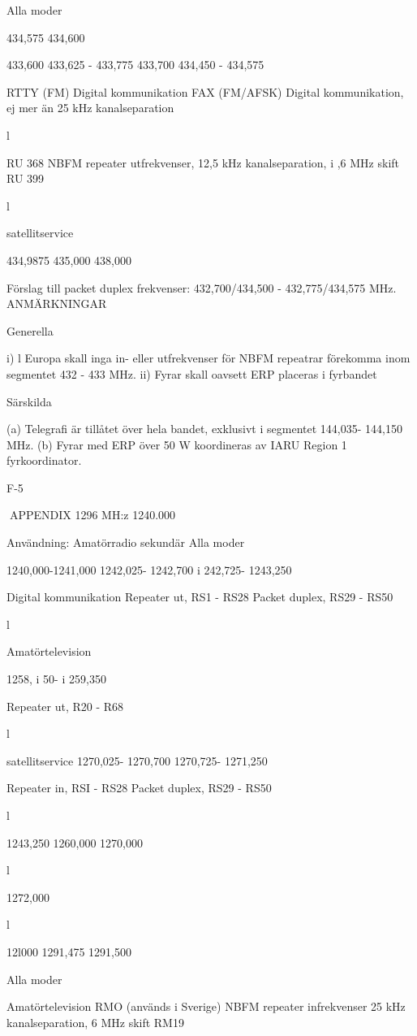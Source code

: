 \documentclass[a4paper,twoside,twocolumn,openright]{book}
\begin{document}
{{{{{{{{{{{Alla moder

434,575
434,600

433,600
433,625 - 433,775
433,700
434,450 - 434,575

RTTY (FM)
Digital kommunikation
FAX (FM/AFSK)
Digital kommunikation, ej mer än
25 kHz kanalseparation

l

RU 368
NBFM repeater utfrekvenser, 12,5 kHz kanalseparation, i ,6 MHz skift
RU 399

l

satellitservice

434,9875
435,000
438,000

Förslag till packet duplex frekvenser: 432,700/434,500 - 432,775/434,575 MHz.
ANMÄRKNINGAR

Generella

i) l Europa skall inga in- eller utfrekvenser för NBFM repeatrar förekomma inom segmentet 432 - 433 MHz.
ii) Fyrar skall oavsett ERP placeras i fyrbandet

Särskilda

(a) Telegrafi är tillåtet över hela bandet, exklusivt i segmentet 144,035- 144,150 MHz.
(b) Fyrar med ERP över 50 W koordineras av IARU Region 1 fyrkoordinator.

F-5

APPENDIX
1296 MH:z
1240.000

Användning: Amatörradio sekundär
Alla moder

1240,000-1241,000
1242,025- 1242,700
i 242,725- 1243,250

Digital kommunikation
Repeater ut, RS1 - RS28
Packet duplex, RS29 - RS50

l

Amatörtelevision

1258, i 50- i 259,350

Repeater ut, R20 - R68

l

satellitservice
1270,025- 1270,700
1270,725- 1271,250

Repeater in, RSI - RS28
Packet duplex, RS29 - RS50

l

1243,250
1260,000
1270,000

l

1272,000

l

12l000
1291,475
1291,500

Alla moder

Amatörtelevision
RMO
(används i Sverige)
NBFM repeater infrekvenser
25 kHz kanalseparation, 6 MHz skift
RM19

}}}}}}}}}}}
\end{document}
